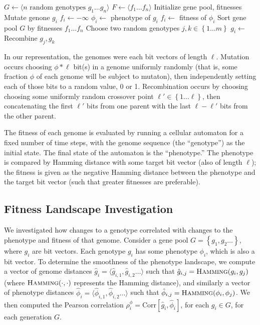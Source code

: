 \documentclass[twocolumn]{article}
\newcommand{\set}[1]{\left\{#1\right\}}
\newcommand{\seq}[1]{\langle #1 \rangle}
\newcommand{\hamming}[2]{\textsc{Hamming}(#1, #2)}
\newcommand{\corr}[2]{\text{Corr}\left[#1, #2\right]}
\begin{document}
\begin{algorithm}
\label{alg:ga}
\begin{algorithmic}[1]
	\State $G \gets \seq{\text{$n$ random genotypes $g_1 \ldots g_n$}}$
	\State $F \gets \seq{f_1 \ldots f_n}$
	\Statex \Comment Initialize gene pool, fitnesses
	\Repeat
		\ForAll{$i \in \set{1 \ldots n}$}
			\State Mutate genone $g_i$
				\State $f_i \gets -\infty$
			\Else
				\State $\phi_i \gets$ phenotype of $g_i$
				\State $f_i \gets$ fitness of $\phi_i$
			\EndIf
		\EndFor
		\State Sort gene pool $G$ by fitnesses $f_1 \ldots f_n$
		\ForAll{$i \in \set{m \ldots n}$}
			\State Choose two random genotypes 
			\State $j,k \in \set{1 \ldots m}$
			\State $g_i \gets$ Recombine $g_j, g_k$
		\EndFor
	\EndProcedure
\end{algorithmic}
\end{algorithm}

In our representation, the genomes were each bit vectors of length $\ell$. Mutation occurs choosing $\phi*\ell$ bit(s) in a genome uniformly randomly (that is, some fraction $\phi$ of each genome will be subject to mutaton), then independently setting each of those bits to a random value, 0 or 1. Recombination occurs by choosing choosing some uniformly random crossover point $\ell' \in \set{1\ldots\ell}$, then concatenating the first $\ell'$ bits from one parent with the last $\ell-\ell'$ bits from the other parent.  

The fitness of each genome is evaluated by running a cellular automaton for a fixed number of time steps, with the genome sequence (the ``genotype'') as the initial state. The final state of the automaton is the ``phenotype.'' The phenotype is compared by Hamming distance with some target bit vector (also of length $\ell$); the fitness is given as the negative Hamming distance between the phenotype and the target bit vector (such that greater fitnesses are preferable). 

\subsection{Fitness Landscape Investigation}

We investigated how changes to a genotype correlated with changes to the phenotype and fitness of that genome. Consider a gene pool $G = \set{g_1, g_2 \ldots}$, where $g_i$ are bit vectors. Each genotype $g_i$ has some phenotype $\phi_i$, which is also a bit vector. To determine the smoothness of the phenotype landscape, we compute a vector of genome distances $\hat{g}_i = \seq{\hat{g}_{i,1}, \hat{g}_{i,2} \ldots}$ such that $\hat{g}_{i,j} = \hamming{g_i}{g_j}$ (where $\hamming{\cdot}{\cdot}$ represents the Hamming distance), and similarly a vector of phenotype distances $\hat{\phi}_i = \seq{\hat{\phi}_{i,1}, \hat{\phi}_{i,2} \ldots}$ such that $\hat{\phi}_{i,j} = \hamming{\phi_i}{\phi_j}$. We then computed the Pearson correlation $\rho_i^\phi = \corr{\hat{g}_i}{\hat{\phi}_i}$, for each $g_i \in G$, for each generation $G$.
\end{document}
